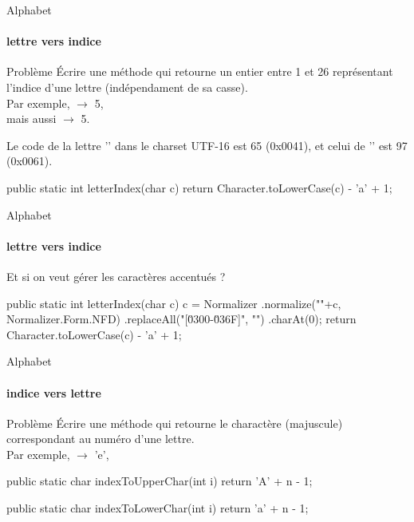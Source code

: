\begin{frame}[fragile]{Alphabet}
  \framesubtitle{lettre vers indice}
  \begin{block}{Problème}
    Écrire une méthode  qui retourne un entier entre 1 et 26
    représentant l'indice d'une lettre (indépendament de sa casse).\\
    Par exemple,  \(\rightarrow\) 5,\\
    mais aussi  \(\rightarrow\) 5.
  \end{block}

  \pause Le code de la lettre '' dans le charset UTF-16 est 65 (0x0041),
  et celui de '' est 97 (0x0061).

  \pause
  \begin{java}
public static int letterIndex(char c) {
    return Character.toLowerCase(c) - 'a' + 1;
}
  \end{java}
\end{frame}

\begin{frame}[fragile]{Alphabet}
  \framesubtitle{lettre vers indice}
  Et si on veut gérer les caractères accentués ?
  \pause
  \begin{java}
public static int letterIndex(char c){
    c = Normalizer
            .normalize(""+c, Normalizer.Form.NFD)
            .replaceAll("[\u0300-\u036F]", "")
            .charAt(0);
    return Character.toLowerCase(c) - 'a' + 1;
}
  \end{java}
\end{frame}

\begin{frame}[fragile]{Alphabet}
  \framesubtitle{indice vers lettre}
  \begin{block}{Problème}
    Écrire une méthode  qui retourne le charactère
    (majuscule) correspondant au numéro d'une lettre.\\
    Par exemple,  \(\rightarrow\) 'e',
  \end{block}
  \pause
  \begin{java}
public static char indexToUpperChar(int i) {
    return 'A' + n - 1;
}
  \end{java}
  \begin{java}
public static char indexToLowerChar(int i) {
    return 'a' + n - 1;
}
  \end{java}
\end{frame}

